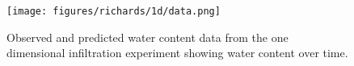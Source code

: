 \begin{figure}[!htbp]
\begin{center}
\texttt{[image: figures/richards/1d/data.png]}
\end{center}
\caption{
    Observed and predicted water content data from the one dimensional infiltration experiment showing water content over time.
}
\label{fig:richards-1d-data}
\end{figure}
